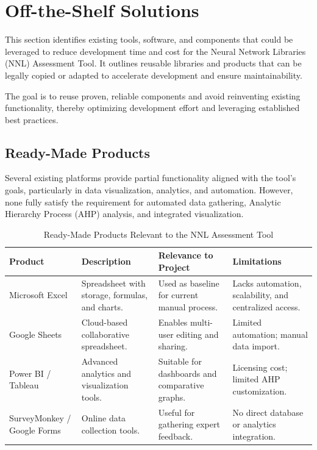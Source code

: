 \documentclass[12pt]{article}
\begin{document}
\section{Off-the-Shelf Solutions}

This section identifies existing tools, software, and components that could be leveraged to reduce development time and cost for the Neural Network Libraries (NNL) Assessment Tool. It outlines reusable libraries and products that can be legally copied or adapted to accelerate development and ensure maintainability.

The goal is to reuse proven, reliable components and avoid reinventing existing functionality, thereby optimizing development effort and leveraging established best practices.

\subsection{Ready-Made Products}

Several existing platforms provide partial functionality aligned with the tool’s goals, particularly in data visualization, analytics, and automation. However, none fully satisfy the requirement for automated data gathering, Analytic Hierarchy Process (AHP) analysis, and integrated visualization.

\begin{table}[H]
\caption{Ready-Made Products Relevant to the NNL Assessment Tool}
\centering
\begin{tabularx}{\textwidth}{|p{2.5cm}|X|X|X|}
\hline
\textbf{Product} & \textbf{Description} & \textbf{Relevance to Project} & \textbf{Limitations} \\ \hline
Microsoft Excel & Spreadsheet with storage, formulas, and charts. & Used as baseline for current manual process. & Lacks automation, scalability, and centralized access. \\ \hline
Google Sheets & Cloud-based collaborative spreadsheet. & Enables multi-user editing and sharing. & Limited automation; manual data import. \\ \hline
Power BI / Tableau & Advanced analytics and visualization tools. & Suitable for dashboards and comparative graphs. & Licensing cost; limited AHP customization. \\ \hline
SurveyMonkey / Google Forms & Online data collection tools. & Useful for gathering expert feedback. & No direct database or analytics integration. \\ \hline
\end{tabularx}
\end{table}
\end{document}
